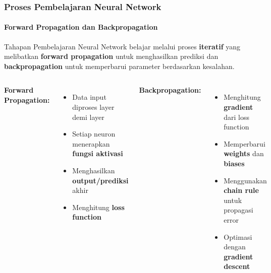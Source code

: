 \documentclass[t,aspectratio=169,xcolor=dvipsnames]{beamer}
\begin{document}
\begin{frame}
    \frametitle{Proses Pembelajaran Neural Network}
    \framesubtitle{Forward Propagation dan Backpropagation}

    \begin{exampleblock}{Tahapan Pembelajaran}
        Neural Network belajar melalui proses \textbf{iteratif} yang melibatkan \textbf{forward propagation} untuk menghasilkan prediksi dan \textbf{backpropagation} untuk memperbarui parameter berdasarkan kesalahan.
    \end{exampleblock}

    \begin{columns}[t]
        \textbf{Forward Propagation:}
        \begin{itemize}
            \item Data input diproses layer demi layer
            \item Setiap neuron menerapkan \textbf{fungsi aktivasi}
            \item Menghasilkan \textbf{output/prediksi} akhir
            \item Menghitung \textbf{loss function}
        \end{itemize}

        \textbf{Backpropagation:}
        \begin{itemize}
            \item Menghitung \textbf{gradient} dari loss function
            \item Memperbarui \textbf{weights} dan \textbf{biases}
            \item Menggunakan \textbf{chain rule} untuk propagasi error
            \item Optimasi dengan \textbf{gradient descent}
        \end{itemize}
    \end{columns}

\end{frame}
\end{document}
